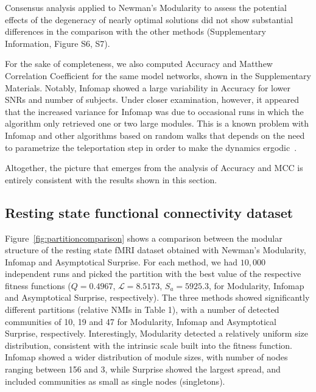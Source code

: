 Consensus analysis applied to Newman's Modularity to assess the potential effects of the degeneracy of nearly optimal solutions did not show substantial differences in the comparison with the other methods (Supplementary Information, Figure S6, S7).

For the sake of completeness, we also computed Accuracy and Matthew Correlation Coefficient for the same model networks, shown in the Supplementary Materials.
Notably, Infomap showed a large variability in Accuracy for lower SNRs and number of subjects.
Under closer examination, however, it appeared that the increased variance for Infomap was due to occasional runs in which the algorithm only retrieved one or two large modules.
This is a known problem with Infomap and other algorithms based on random walks that depends on the need to parametrize the teleportation step in order to make the dynamics ergodic~\cite{lambiotte2012}.

Altogether, the picture that emerges from the analysis of Accuracy and MCC is entirely consistent with the results shown in this section.

\subsection{Resting state functional connectivity dataset}

Figure~\ref{fig:partitioncomparison} shows a comparison between the modular structure of the resting state fMRI dataset obtained with Newman's Modularity, Infomap and Asymptotical Surprise.
For each method, we had $10,000$ independent runs and picked the partition with the best value of the respective fitness functions ($Q=0.4967$, $\mathcal{L}=8.5173$, $S_a=5925.3$, for Modularity, Infomap and Asymptotical Surprise, respectively).
The three methods showed significantly different partitions (relative NMIs in Table 1), with a number of detected communities of 10, 19 and 47 for Modularity, Infomap and Asymptotical Surprise, respectively.
Interestingly, Modularity detected a relatively uniform size distribution, consistent with the intrinsic scale built into the fitness function.
Infomap showed a wider distribution of module sizes, with number of nodes ranging between 156 and 3, while Surprise showed the largest spread, and included communities as small as single nodes (singletons).

